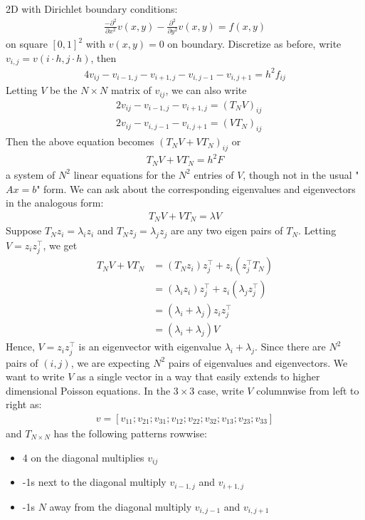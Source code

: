\documentclass[11pt]{article}
\numberwithin{equation}{section}
\begin{document}
2D with Dirichlet boundary conditions:\begin{align*}
    \frac{-\partial^{2}}{\partial x^{2}} v(x, y)-\frac{\partial^{2}}{\partial y^{2}} v(x, y) = f(x, y)
\end{align*}
on square $[0,1]^2$ with $v(x,y)=0$ on boundary. Discretize as before, write $v_{i,j}=v(i \cdot h, j\cdot h)$, then \begin{align*}
    4v_{ij} - v_{i-1,j} - v_{i+1,j} - v_{i,j-1} - v_{i,j+1} = h^2 f_{ij}
\end{align*}
Letting $V$ be the $N\times N$ matrix of $v_{ij}$, we can also write \begin{align*}
    & 2v_{ij} - v_{i-1,j} - v_{i+1,j} = (T_N V)_{ij} \\
    & 2v_{ij} - v_{i,j-1} - v_{i,j+1} = (V T_N )_{ij}
\end{align*}
Then the above equation becomes $(T_N V + V T_N )_{ij}$ or \begin{align*}
    T_N V + V T_N=h^2 F
\end{align*}
a system of $N^2$ linear equations for the $N^2$ entries of $V$, though not in the usual "$Ax=b$" form.
We can ask about the corresponding eigenvalues and eigenvectors in the analogous form:\begin{align*}
    T_N V + V T_N=\lambda V
\end{align*}
Suppose $T_N z_i = \lambda_i z_i$ and $T_N z_j = \lambda_j z_j$ are any two eigen pairs of $T_N$. Letting $V = z_i  z_j^\top$, we get \begin{align*}
    T_N V + V T_N &= (T_N z_i) z_j^\top + z_i (z_j^\top T_N) \\
    &= (\lambda_i z_i) z_j^\top + z_i (\lambda_j z_j^\top) \\
    &= \left( \lambda_i + \lambda_j \right) z_i z_j^\top \\
    &= \left( \lambda_i + \lambda_j \right) V
\end{align*}
Hence, $V=z_i z_j^\top$ is an eigenvector with eigenvalue $\lambda_i + \lambda_j$. Since there are $N^2$ pairs of $(i,j)$, we are expecting $N^2$ pairs of eigenvalues and eigenvectors.
We want to write $V$ as a single vector in a way that easily extends to higher dimensional Poisson equations. In the $3\times 3$ case, write $V$ columnwise from left to right as:\begin{align*}
    v = [ v_{11}; v_{21}; v_{31}; v_{12}; v_{22}; v_{32}; v_{13}; v_{23}; v_{33} ]
\end{align*}
and $T_{N \times N}$ has the following patterns rowwise:\begin{itemize}
    \item 4 on the diagonal multiplies $v_{ij}$
    \item -1s next to the diagonal multiply $v_{i-1,j}$ and $v_{i+1,j}$
    \item -1s $N$ away from the diagonal multiply $v_{i,j-1}$ and $v_{i,j+1}$
\end{itemize}
\end{document}
